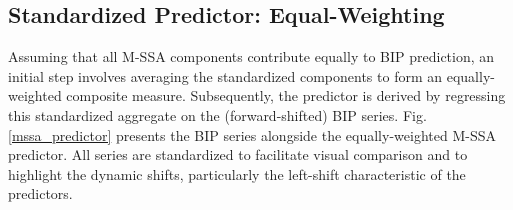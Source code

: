 \documentclass[a4paper]{article}
\begin{document}
\subsection{Standardized Predictor: Equal-Weighting}


Assuming that all M-SSA components contribute equally to BIP prediction, an initial step involves averaging the standardized components to form an equally-weighted composite measure. Subsequently, the predictor is derived by regressing this standardized aggregate on the (forward-shifted) BIP series. Fig. \eqref{mssa_predictor} presents the BIP series alongside the equally-weighted M-SSA predictor. All series are standardized to facilitate visual comparison and to highlight the dynamic shifts, particularly the left-shift characteristic of the predictors.\\
\end{document}
